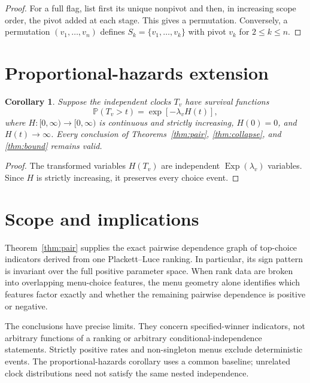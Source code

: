 \documentclass[11pt]{article}
\newtheorem{corollary}[theorem]{Corollary}
\theoremstyle{definition}
\newcommand{\Pp}{\mathbb{P}}
\newcommand{\1}{\mathbf{1}}
\newcommand{\Exp}{\operatorname{Exp}}
\begin{document}
\begin{proof}
For a full flag, list first its unique nonpivot and then, in increasing scope order, the pivot added
at each stage. This gives a permutation. Conversely, a permutation
\((v_1,\ldots,v_n)\) defines \(S_k=\{v_1,\ldots,v_k\}\) with pivot \(v_k\) for
\(2\leq k\leq n\).
\end{proof}

\section{Proportional-hazards extension}

\begin{corollary}
Suppose the independent clocks \(T_v\) have survival functions
\[
\Pp(T_v>t)=\exp[-\lambda_v H(t)],
\]
where \(H:[0,\infty)\to[0,\infty)\) is continuous and strictly increasing, \(H(0)=0\), and
\(H(t)\to\infty\). Every conclusion of Theorems~\ref{thm:pair}, \ref{thm:collapse}, and
\ref{thm:bound} remains valid.
\end{corollary}

\begin{proof}
The transformed variables \(H(T_v)\) are independent \(\Exp(\lambda_v)\) variables. Since \(H\) is
strictly increasing, it preserves every choice event.
\end{proof}

\section{Scope and implications}

Theorem~\ref{thm:pair} supplies the exact pairwise dependence graph of top-choice indicators derived
from one Plackett--Luce ranking. In particular, its sign pattern is invariant over the full positive
parameter space. When rank data are broken into overlapping menu-choice features, the menu geometry
alone identifies which features factor exactly and whether the remaining pairwise dependence is
positive or negative.

The conclusions have precise limits. They concern specified-winner indicators, not arbitrary
functions of a ranking or arbitrary conditional-independence statements. Strictly positive rates
and non-singleton menus exclude deterministic events. The proportional-hazards corollary uses a
common baseline; unrelated clock distributions need not satisfy the same nested independence.
\end{document}

